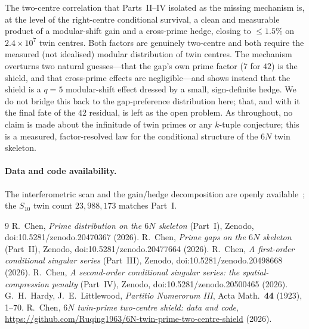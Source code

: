 \documentclass[11pt]{article}
\begin{document}
The two-centre correlation that Parts~II--IV isolated as the missing mechanism is,
at the level of the right-centre conditional survival, a clean and measurable
product of a modular-shift gain and a cross-prime hedge, closing to $\leq1.5\%$
on $2.4\times10^{7}$ twin centres. Both factors are genuinely two-centre and both
require the measured (not idealised) modular distribution of twin centres. The
mechanism overturns two natural guesses---that the gap's own prime factor ($7$
for $42$) is the shield, and that cross-prime effects are negligible---and shows
instead that the shield is a $q=5$ modular-shift effect dressed by a small,
sign-definite hedge. We do not bridge this back to the gap-preference
distribution here; that, and with it the final fate of the $42$ residual, is left
as the open problem. As throughout, no claim is made about the infinitude of twin
primes or any $k$-tuple conjecture; this is a measured, factor-resolved law for
the conditional structure of the $6N$ twin skeleton.

\paragraph{Data and code availability.}
The interferometric scan and the gain/hedge decomposition are openly
available~\cite{repo}; the $S_{10}$ twin count $23{,}988{,}173$ matches Part~I.

\begin{thebibliography}{9}
 R.~Chen, \emph{Prime distribution on the $6N$ skeleton} (Part~I),
Zenodo, doi:10.5281/zenodo.20470367 (2026).
 R.~Chen, \emph{Prime gaps on the $6N$ skeleton} (Part~II),
Zenodo, doi:10.5281/zenodo.20477664 (2026).
 R.~Chen, \emph{A first-order conditional singular series}
(Part~III), Zenodo, doi:10.5281/zenodo.20498668 (2026).
 R.~Chen, \emph{A second-order conditional singular series:
the spatial-compression penalty} (Part~IV), Zenodo, doi:10.5281/zenodo.20500465 (2026).
 G.~H.~Hardy, J.~E.~Littlewood, \emph{Partitio Numerorum III}, Acta
Math.\ \textbf{44} (1923), 1--70.
 R.~Chen, \emph{$6N$ twin-prime two-centre shield: data and code},
\url{https://github.com/Ruqing1963/6N-twin-prime-two-centre-shield} (2026).
\end{thebibliography}
\end{document}
